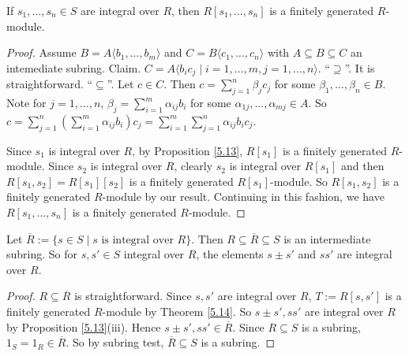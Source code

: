 \begin{theorem}\label{5.14}
    If $s_1,\ldots,s_n \in S$ are integral over $R$, then $R[s_1,\ldots,s_n]$ is a finitely generated $R$-module. 
\end{theorem}

\begin{proof}
    Assume $B = A\langle b_1,\ldots,b_m \rangle$ and $C = B\langle c_1,\ldots,c_n \rangle$ with $A \subseteq B \subseteq C$ an intemediate subring. Claim. $C = A \langle b_ic_j \mid i = 1,\ldots,m, j = 1,\ldots,n\rangle$. ``$\supseteq$''. It is straightforward. ``$\subseteq$''. Let $c \in C$. Then $c = \sum_{j=1}^{n} \beta_jc_j$ for some $\beta_1,\ldots,\beta_n \in B$. Note for $j = 1,\ldots,n$, $\beta_j = \sum_{i=1}^{m} \alpha_{ij}b_i$ for some $\alpha_{1j},\ldots,\alpha_{mj} \in A$. So $c = \sum_{j=1}^{n}(\sum_{i=1}^{m}\alpha_{ij}b_i)c_j = \sum_{i=1}^{m}\sum_{j=1}^{n} \alpha_{ij}b_ic_j$. \par
    Since $s_1$ is integral over $R$, by Proposition \ref{5.13}, $R[s_1]$ is a finitely generated $R$-module. Since $s_2$ is integral over $R$, clearly $s_2$ is integral over $R[s_1]$ and then $R[s_1,s_2] = R[s_1][s_2]$ is a finitely generated $R[s_1]$-module. So $R[s_1,s_2]$ is a finitely generated $R$-module by our result. Continuing in this fashion, we have $R[s_1,\ldots,s_n]$ is a finitely generated $R$-module.
\end{proof}

\begin{theorem}\label{5.15}
    Let $\overbar{R} := \{s \in S \mid s \text{ is integral over }R\}$. Then $R \subseteq \overbar{R} \subseteq S$ is an intermediate subring. So for $s,s' \in S$ integral over $R$, the elements $s \pm s'$ and $ss'$ are integral over $R$.
\end{theorem}

\begin{proof}
    $R \subseteq \overbar{R}$ is straightforward. Since $s,s'$ are integral over $R$, $T := R[s,s']$ is a finitely generated $R$-module by Theorem \ref{5.14}. So $s \pm s',ss'$ are integral over $R$ by Proposition \ref{5.13}(iii). Hence $s \pm s', ss' \in \overbar{R}$. Since $R \subseteq S$ is a subring, $1_S = 1_R \in \overbar{R}$. So by subring test, $\overbar{R} \subseteq S$ is a subring. 
\end{proof}

